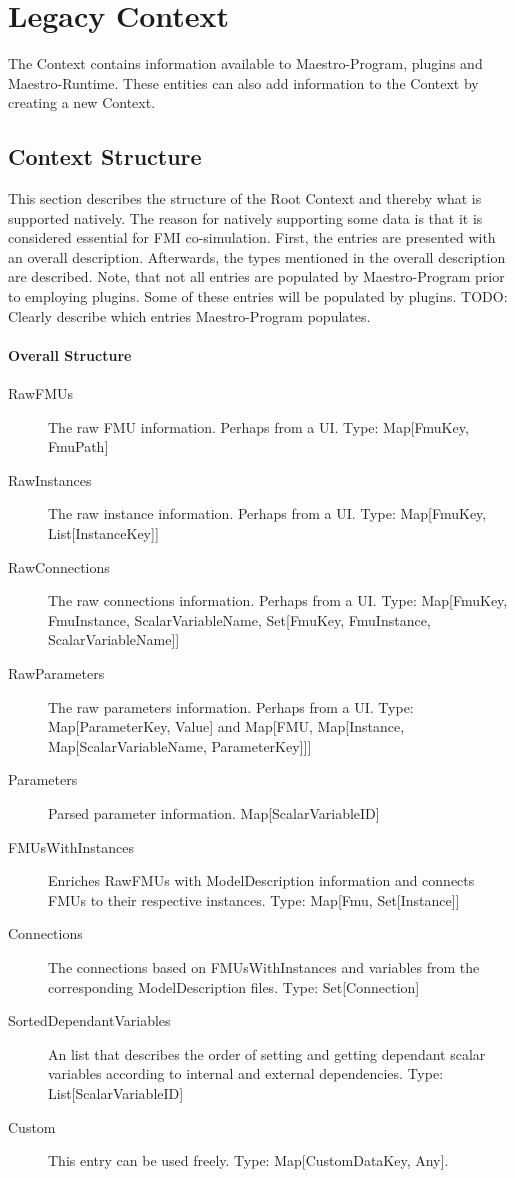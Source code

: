 \section{Legacy Context}
The Context contains information available to Maestro-Program,
plugins and Maestro-Runtime. These entities can also add information to the
Context by creating a new Context.

\subsection{Context Structure}
This section describes the structure of the Root Context and thereby what is
supported natively. The reason for natively supporting some data is that it is
considered essential for FMI co-simulation.
First, the entries are presented with an overall description. Afterwards, the types
mentioned in the overall description are described. Note, that not all entries are populated
by Maestro-Program prior to employing plugins. Some of these entries will be
populated by plugins. TODO: Clearly describe which entries Maestro-Program
populates.
\paragraph{Overall Structure}
\begin{description}
  \item[RawFMUs] The raw FMU information. Perhaps from a UI. Type: Map[FmuKey, FmuPath]
  \item[RawInstances] The raw instance information. Perhaps from a UI. Type: Map[FmuKey, List[InstanceKey]]
  \item[RawConnections] The raw connections information. Perhaps from a UI.
    Type: Map[{FmuKey, FmuInstance, ScalarVariableName}, Set[{FmuKey, FmuInstance, ScalarVariableName}]]
  \item[RawParameters] The raw parameters information. Perhaps from a UI.
    Type: Map[ParameterKey, Value] and Map[FMU, Map[Instance,
    Map[ScalarVariableName, ParameterKey]]]
  \item[Parameters] Parsed parameter information. Map[ScalarVariableID]
  \item[FMUsWithInstances] Enriches RawFMUs with ModelDescription information
    and connects FMUs to their respective instances. Type: Map[Fmu, Set[Instance]]
  \item[Connections] The connections based on FMUsWithInstances and variables
    from the corresponding ModelDescription files. Type: Set[Connection]
  \item[SortedDependantVariables] An list that describes the order of setting
    and getting dependant scalar variables according to internal and external
    dependencies. Type: List[ScalarVariableID]
    \item[Custom] This entry can be used freely. Type: Map[CustomDataKey, Any].
\end{description}

